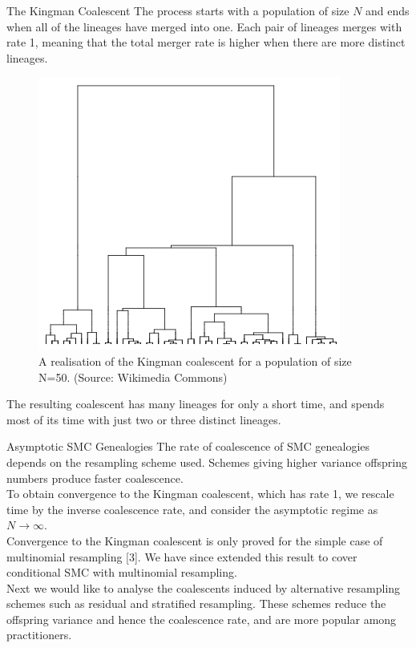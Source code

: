\documentclass[final, 12pt]{beamer}
\newlength{\colwidth}
\begin{document}
\begin{frame}
\begin{columns}
\begin{column}{\colwidth}
\begin{block}{The Kingman Coalescent}
The process starts with a population of size $N$ and ends when all of the lineages have merged into one.
Each pair of lineages merges with rate 1, meaning that the total merger rate is higher when there are more distinct lineages. 
\begin{figure}
\includegraphics[width=0.8\colwidth]{kingman.png}
\caption{A realisation of the Kingman coalescent for a population of size N=50. \textmd{(Source: Wikimedia Commons)}}
\end{figure}
The resulting coalescent has many lineages for only a short time, and spends most of its time with just two or three distinct lineages.
\end{block}

\vspace*{15pt}

\begin{block}{Asymptotic SMC Genealogies}
The rate of coalescence of SMC genealogies depends on the resampling scheme used. 
Schemes giving higher variance offspring numbers produce faster coalescence.\\[10pt]

To obtain convergence to the Kingman coalescent, which has rate 1, we rescale time by the inverse coalescence rate, and consider the asymptotic regime as  $N\to\infty$.\\[10pt]

Convergence to the Kingman coalescent is only proved for the simple case of multinomial resampling [3]. We have since extended this result to cover conditional SMC with multinomial resampling.\\[10pt]

Next we would like to analyse the coalescents induced by alternative resampling schemes such as residual and stratified resampling. These schemes reduce the offspring variance and hence the coalescence rate, and are more popular among practitioners.
\end{block}


\end{column}
\end{columns}
\end{frame}
\end{document}
